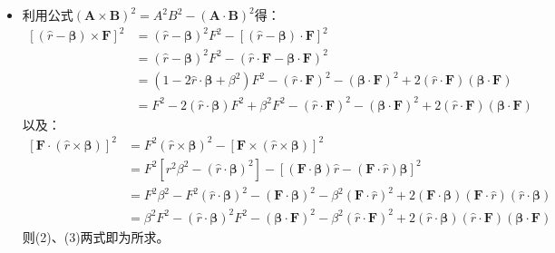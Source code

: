 \documentclass[a4paper,fontset=none]{ctexart}
\begin{document}
\begin{itemize}
    \item[7.(2)]
    利用公式$(\bm{A}\times\bm{B})^2=A^2B^2-(\bm{A}\cdot\bm{B})^2$得：
    \begin{equation}
        \begin{aligned}
            \left[(\hat{r}-\bm{\beta}) \times \bm{F}\right]^2
            &= (\hat{r}-\bm{\beta})^2 F^2 - \left[(\hat{r}-\bm{\beta}) \cdot \bm{F}\right]^2 \\
            &= (\hat{r}-\bm{\beta})^2 F^2 - (\hat{r} \cdot \bm{F} - \bm{\beta} \cdot \bm{F})^2 \\
            &= (1 - 2\hat{r}\cdot\bm{\beta} + \beta^2) F^2 - (\hat{r} \cdot \bm{F})^2 - (\bm{\beta} \cdot \bm{F})^2 + 2(\hat{r} \cdot \bm{F})(\bm{\beta} \cdot \bm{F}) \\
            &= F^2 - 2(\hat{r}\cdot\bm{\beta})F^2 + \beta^2F^2 - (\hat{r} \cdot \bm{F})^2 - (\bm{\beta} \cdot \bm{F})^2 + 2(\hat{r} \cdot \bm{F})(\bm{\beta} \cdot \bm{F})
        \end{aligned}
    \end{equation}
    以及：
    \begin{equation}
        \begin{aligned}
            \left[\bm{F} \cdot (\hat{r} \times \bm{\beta})\right]^2
            &= F^2 (\hat{r} \times \bm{\beta})^2 - \left[\bm{F} \times (\hat{r} \times \bm{\beta})\right]^2 \\
            &= F^2 \left[r^2\beta^2 - (\hat{r}\cdot\bm{\beta})^2\right] - \left[(\bm{F}\cdot\bm{\beta})\hat{r} - (\bm{F}\cdot\hat{r})\bm{\beta}\right]^2 \\
            &= F^2\beta^2 - F^2 (\hat{r} \cdot \bm{\beta})^2 - (\bm{F} \cdot \bm{\beta})^2 - \beta^2 (\bm{F} \cdot \hat{r})^2 + 2(\bm{F} \cdot \bm{\beta})(\bm{F} \cdot \hat{r})(\hat{r} \cdot \bm{\beta}) \\
            &= \beta^2F^2 - (\hat{r} \cdot \bm{\beta})^2 F^2 - (\bm{\beta} \cdot \bm{F})^2 - \beta^2 (\hat{r} \cdot \bm{F})^2 + 2(\hat{r} \cdot \bm{\beta})(\hat{r} \cdot \bm{F})(\bm{\beta} \cdot \bm{F})
        \end{aligned}
    \end{equation}
    则(2)、(3)两式即为所求。


\end{itemize}
\end{document}
